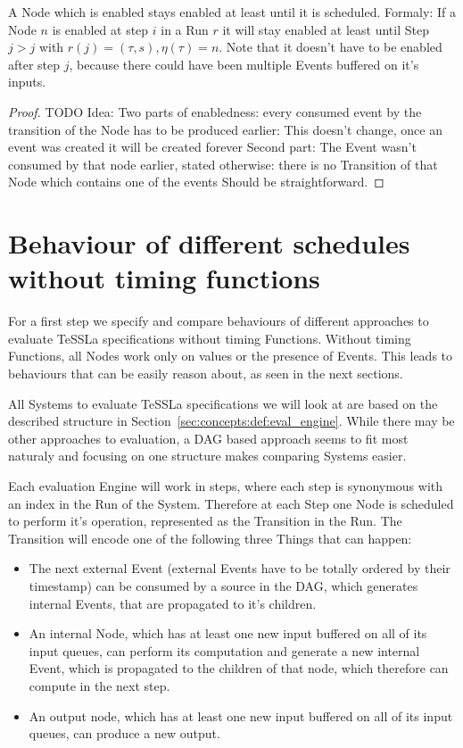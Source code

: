 \begin{lemma}[name = Duration of Enabledness]\label{lemma:enabled_till_scheduled}
  A Node which is enabled stays enabled at least until it is scheduled.
  Formaly: If a Node \(n\) is enabled at step \(i\) in a Run \(r\) it will stay enabled at least until Step \(j > j\) with \(r(j) = (\tau,s), \eta(\tau) = n\).
  Note that it doesn't have to be enabled after step \(j\), because there could have been multiple Events buffered on it's inputs.
\end{lemma}

\begin{proof}
TODO Idea: Two parts of enabledness: every consumed event by the transition of the Node has to be produced earlier: This doesn't change, once an event was created it will be created forever
Second part: The Event wasn't consumed by that node earlier, stated otherwise: there is no Transition of that Node which contains one of the events
Should be straightforward.
\end{proof}


\section{Behaviour of different schedules without timing functions}
\label{sec:concepts:behaviour_without_timing}

For a first step we specify and compare behaviours of different approaches to evaluate TeSSLa specifications without timing Functions.
Without timing Functions, all Nodes work only on values or the presence of Events.
This leads to behaviours that can be easily reason about, as seen in the next sections.

All Systems to evaluate TeSSLa specifications we will look at are based on the described structure in Section~\ref{sec:concepts:def:eval_engine}.
While there may be other approaches to evaluation, a DAG based approach seems to fit most naturaly and focusing on one structure makes comparing Systems easier.

Each evaluation Engine will work in steps, where each step is synonymous with an index in the Run of the System.
Therefore at each Step one Node is scheduled to perform it's operation, represented as the Transition in the Run.
The Transition will encode one of the following three Things that can happen:

\begin{itemize}
  \item The next external Event (external Events have to be totally ordered by their timestamp) can be consumed by a source in the DAG, which generates internal Events, that are propagated to it's children.
  \item An internal Node, which has at least one new input buffered on all of its input queues, can perform
    its computation and generate a new internal Event, which is propagated to the children of that node, which therefore can compute in the next step.
  \item An output node, which has at least one new input buffered on all of its input queues, can produce a new output.
\end{itemize}

